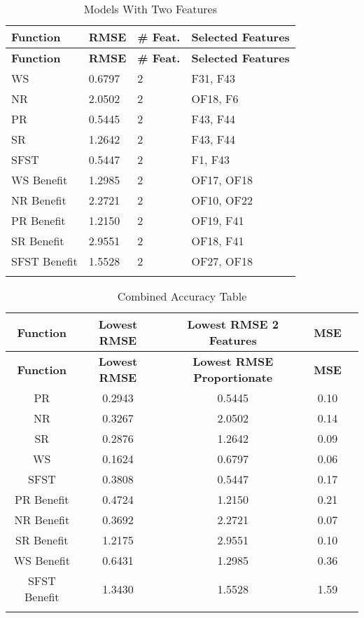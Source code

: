\begin{longtable}{|p{3cm}|p{2cm}|p{2cm}|p{8cm}|}
\hline
\textbf{Function} & \textbf{RMSE} & \textbf{\# Feat.} & \textbf{Selected Features} \\ \hline
\endfirsthead
\hline
\textbf{Function} & \textbf{RMSE} & \textbf{\# Feat.} & \textbf{Selected Features} \\ \hline
\endhead

WS & 0.6797 & 2 & F31, F43 \\ \hline
NR & 2.0502 & 2 & OF18, F6 \\ \hline
PR & 0.5445 & 2 & F43, F44 \\ \hline
SR & 1.2642 & 2 & F43, F44 \\ \hline
SFST & 0.5447 & 2 & F1, F43 \\ \hline
WS Benefit & 1.2985 & 2 & OF17, OF18 \\ \hline
NR Benefit & 2.2721 & 2 & OF10, OF22 \\ \hline
PR Benefit & 1.2150 & 2 & OF19, F41 \\ \hline
SR Benefit & 2.9551 & 2 & OF18, F41 \\ \hline
SFST Benefit & 1.5528 & 2 & OF27, OF18 \\ \hline

\caption{Models With Two Features}
\label{fig_reg_spec:lowest_rmse_prop_feat}
\end{longtable}

\begin{longtable}{|c|c|c|c|c|}
\hline
\textbf{Function} & \textbf{Lowest RMSE} & \textbf{Lowest RMSE 2 Features} & \textbf{MSE} \\ \hline
\endfirsthead
\hline
\textbf{Function} & \textbf{Lowest RMSE} & \textbf{Lowest RMSE Proportionate} & \textbf{MSE} \\ \hline
\endhead

PR & 0.2943 & 0.5445 & 0.10 \\ \hline
NR & 0.3267 & 2.0502 & 0.14 \\ \hline
SR & 0.2876 & 1.2642 & 0.09 \\ \hline
WS & 0.1624 & 0.6797 & 0.06 \\ \hline
SFST & 0.3808 & 0.5447 & 0.17 \\ \hline
PR Benefit & 0.4724 & 1.2150 & 0.21 \\ \hline
NR Benefit & 0.3692 & 2.2721 & 0.07 \\ \hline
SR Benefit & 1.2175 & 2.9551 & 0.10 \\ \hline
WS Benefit & 0.6431 & 1.2985 & 0.36 \\ \hline
SFST Benefit & 1.3430 & 1.5528 & 1.59 \\ \hline

\caption{Combined Accuracy Table}
\label{fig_reg_spec:all_rmse_feat}
\end{longtable}
